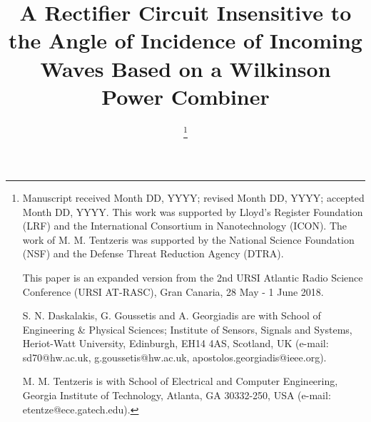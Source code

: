 \documentclass[journal]{IEEEtran}
\begin{document}
\title{A Rectifier Circuit Insensitive  to the  Angle of Incidence of Incoming Waves Based on a Wilkinson Power Combiner}

\author{

\thanks{
Manuscript received Month DD, YYYY; revised Month DD, YYYY; accepted Month DD, YYYY.
This work was supported by Lloyd's Register Foundation (LRF) and the International Consortium in Nanotechnology (ICON).
%
The work of M. M. Tentzeris was supported by the National Science Foundation (NSF) and the Defense Threat Reduction Agency (DTRA).
%


This paper is an expanded version from the
2nd URSI Atlantic Radio Science Conference (URSI AT-RASC), Gran Canaria, 28 May - 1 June 2018.

S. N. Daskalakis, G. Goussetis and A. Georgiadis  are with School of Engineering \& Physical Sciences;  Institute of Sensors, Signals and Systems, Heriot-Watt University, Edinburgh, EH14 4AS, Scotland,
UK (e-mail: sd70@hw.ac.uk, g.goussetis@hw.ac.uk, apostolos.georgiadis@ieee.org).

M. M. Tentzeris is with School of Electrical and Computer Engineering, Georgia Institute of Technology, Atlanta, GA 30332-250, USA (e-mail: etentze@ece.gatech.edu).
}}




\maketitle
\end{document}
